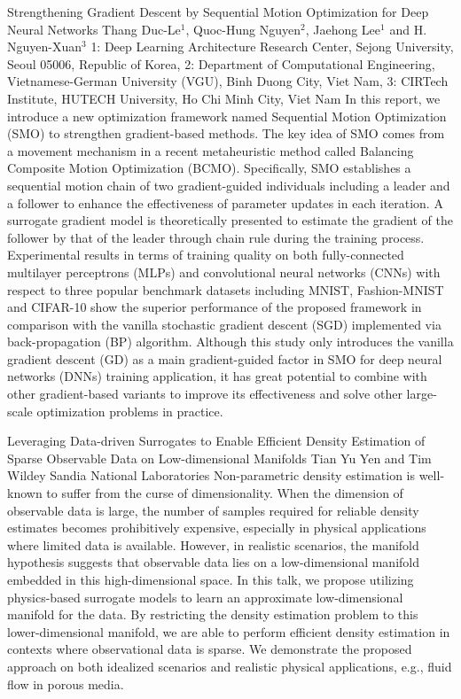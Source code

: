 \vspace{1.5ex}
\abs
{Strengthening Gradient Descent by Sequential Motion Optimization for Deep Neural Networks}
{Thang Duc-Le$^{1}$, Quoc-Hung Nguyen$^{2}$, Jaehong Lee$^{1}$ and H. Nguyen-Xuan$^{3}$}
{1: Deep Learning Architecture Research Center, Sejong University, Seoul 05006, Republic of Korea, 2: Department of Computational Engineering, Vietnamese-German University (VGU), Binh Duong City, Viet Nam, 3: CIRTech Institute, HUTECH University, Ho Chi Minh City, Viet Nam}
{In this report, we introduce a new optimization framework named Sequential Motion Optimization (SMO) to strengthen gradient-based methods. The key idea of SMO comes from a movement mechanism in a recent metaheuristic method called Balancing Composite Motion Optimization (BCMO). Specifically, SMO establishes a sequential motion chain of two gradient-guided individuals including a leader and a follower to enhance the effectiveness of parameter updates in each iteration. A surrogate gradient model is theoretically presented to estimate the gradient of the follower by that of the leader through chain rule during the training process. Experimental results in terms of training quality on both fully-connected multilayer perceptrons (MLPs) and convolutional neural networks (CNNs) with respect to three popular benchmark datasets including MNIST, Fashion-MNIST and CIFAR-10 show the superior performance of the proposed framework in comparison with the vanilla stochastic gradient descent (SGD) implemented via back-propagation (BP) algorithm. Although this study only introduces the vanilla gradient descent (GD) as a main gradient-guided factor in SMO for deep neural networks (DNNs) training application, it has great potential to combine with other gradient-based variants to improve its effectiveness and solve other large-scale optimization problems in practice.}


\vspace{1.5ex}
\abs
{Leveraging Data-driven Surrogates to Enable Efficient Density Estimation of Sparse Observable Data on Low-dimensional Manifolds}
{Tian Yu Yen and Tim Wildey}
{Sandia National Laboratories}
{Non-parametric density estimation is well-known to suffer from the curse of dimensionality. When the dimension of observable data is large, the number of samples required for reliable density estimates becomes prohibitively expensive, especially in physical applications where limited data is available. However, in realistic scenarios, the manifold hypothesis suggests that observable data lies on a low-dimensional manifold embedded in this high-dimensional space. In this talk, we propose utilizing physics-based surrogate models to learn an approximate low-dimensional manifold for the data. By restricting the density estimation problem to this lower-dimensional manifold, we are able to perform efficient density estimation in contexts where observational data is sparse. We demonstrate the proposed approach on both idealized scenarios and realistic physical applications, e.g., fluid flow in porous media.}


